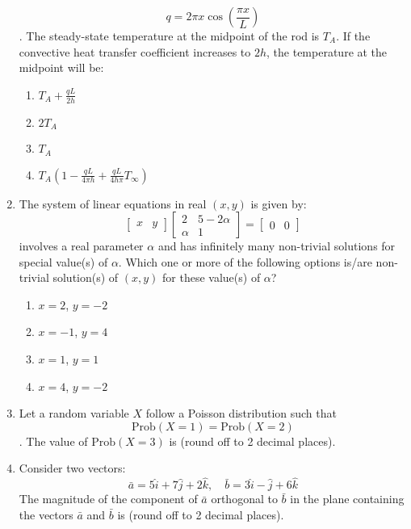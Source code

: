 \documentclass[journal,12pt,onecolumn]{IEEEtran}
\theoremstyle{remark}
\begin{document}
\begin{enumerate}
    $$q = 2 \pi x \cos \left(\frac{\pi x}{L}\right)$$.
    The steady-state temperature at the midpoint of the rod is $T_A$. If the convective heat transfer coefficient increases to $2h$, the temperature at the midpoint will be:
    \begin{enumerate}
        \item $T_A + \frac{qL}{2h}$
        \item $2T_A$
        \item $T_A$
        \item $T_A \left(1 - \frac{qL}{4\pi h} +  \frac{qL}{4h\pi} T_\infty\right)$
    \end{enumerate}
    \item The system of linear equations in real $(x, y)$ is given by:
\[
    \begin{bmatrix}
        x & y  
    \end{bmatrix}
    \begin{bmatrix} 2 & 5-2\alpha \\ \alpha & 1 \end{bmatrix} = \begin{bmatrix} 0 & 0 \end{bmatrix}
\]
    involves a real parameter $\alpha$ and has infinitely many non-trivial solutions for special value(s) of $\alpha$. Which one or more of the following options is/are non-trivial solution(s) of $(x, y)$ for these value(s) of $\alpha$?
    \begin{enumerate}
        \item $x = 2$, $y = -2$
        \item $x = -1$, $y = 4$
        \item $x = 1$, $y = 1$
        \item $x = 4$, $y = -2$
    \end{enumerate}
    \item Let a random variable $X$ follow a Poisson distribution such that 
    $$\text{Prob}(X = 1) = \text{Prob}(X = 2)$$.
    The value of $\text{Prob}(X = 3)$
    is {\underline{\hspace{2cm}}}(round off to 2 decimal places).
    \item Consider two vectors:
\[
    \bar{a} = 5\hat{i} + 7\hat{j} + 2\hat{k}, \quad \bar{b} = 3\hat{i} - \hat{j} + 6\hat{k}
\]
    The magnitude of the component of $\bar{a}$ orthogonal to $\bar{b}$ in the plane containing the vectors $\bar{a}$ and $\bar{b}$ is {\underline{\hspace{2cm}}}(round off to 2 decimal places).


\end{enumerate}
\end{document}
